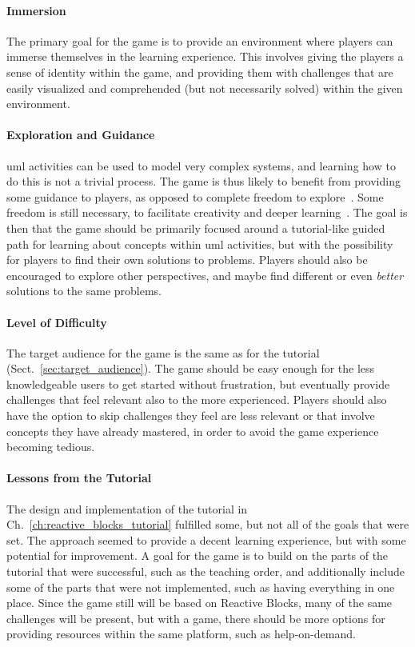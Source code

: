 \paragraph{Immersion} The primary goal for the game is to provide an environment where players can immerse themselves in the learning experience. This involves giving the players a sense of identity within the game, and providing them with challenges that are easily visualized and comprehended (but not necessarily solved) within the given environment.

\paragraph{Exploration and Guidance} \gls{uml} activities can be used to model very complex systems, and learning how to do this is not a trivial process. The game is thus likely to benefit from providing some guidance to players, as opposed to complete freedom to explore~\cite{andersen:tutorials_impact}. Some freedom is still necessary, to facilitate creativity and deeper learning~\cite{bonawitz:double_edged_pedagogy}. The goal is then that the game should be primarily focused around a tutorial-like guided path for learning about concepts within \gls{uml} activities, but with the possibility for players to find their own solutions to problems. Players should also be encouraged to explore other perspectives, and maybe find different or even \emph{better} solutions to the same problems.

\paragraph{Level of Difficulty} The target audience for the game is the same as for the tutorial (Sect.~\ref{sec:target_audience}). The game should be easy enough for the less knowledgeable users to get started without frustration, but eventually provide challenges that feel relevant also to the more experienced. Players should also have the option to skip challenges they feel are less relevant or that involve concepts they have already mastered, in order to avoid the game experience becoming tedious.

\paragraph{Lessons from the Tutorial} The design and implementation of the tutorial in Ch.~\ref{ch:reactive_blocks_tutorial} fulfilled some, but not all of the goals that were set. The approach seemed to provide a decent learning experience, but with some potential for improvement. A goal for the game is to build on the parts of the tutorial that were successful, such as the teaching order, and additionally include some of the parts that were not implemented, such as having everything in one place. Since the game still will be based on Reactive Blocks, many of the same challenges will be present, but with a game, there should be more options for providing resources within the same platform, such as help-on-demand.


